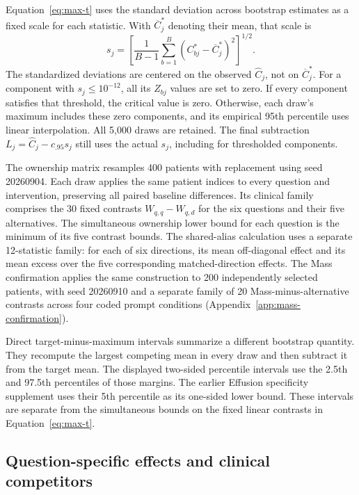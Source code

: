 Equation~\ref{eq:max-t} uses the standard deviation across bootstrap
estimates as a fixed scale for each statistic. With $\overline C^*_j$
denoting their mean, that scale is
\begin{equation}
s_j=\left[\frac{1}{B-1}\sum_{b=1}^{B}
       (C^*_{bj}-\overline C^*_j)^2\right]^{1/2}.
\label{eq:bootstrap-scale}
\end{equation}
The standardized deviations are centered on the observed $\widehat C_j$,
not on $\overline C^*_j$. For a component with $s_j\leq10^{-12}$,
all its $Z_{bj}$ values are set to zero. If every component satisfies
that threshold, the critical value is zero. Otherwise, each draw's
maximum includes these zero components, and its empirical 95th percentile
uses linear interpolation. All 5,000 draws are retained. The final
subtraction $L_j=\widehat C_j-c_{.95}s_j$ still uses the actual $s_j$,
including for thresholded components.

The ownership matrix resamples 400 patients with replacement using seed
20260904. Each draw applies the same patient indices to every question
and intervention, preserving all paired baseline differences. Its clinical
family comprises the 30 fixed contrasts $W_{q,q}-W_{q,d}$ for the six
questions and their five alternatives. The simultaneous ownership lower
bound for each question is the minimum of its five contrast bounds.
The shared-alias calculation uses a separate 12-statistic family:
for each of six directions, its mean off-diagonal effect and its mean
excess over the five corresponding matched-direction effects.
The Mass confirmation applies the same construction to 200 independently
selected patients, with seed 20260910 and a separate family of 20
Mass-minus-alternative contrasts across four coded prompt conditions
(Appendix~\ref{app:mass-confirmation}).

Direct target-minus-maximum intervals summarize a different bootstrap
quantity. They recompute the largest competing mean in every draw and
then subtract it from the target mean. The displayed two-sided percentile
intervals use the 2.5th and 97.5th percentiles of those margins. The
earlier Effusion specificity supplement uses their 5th percentile as its
one-sided lower bound. These intervals are separate from the simultaneous
bounds on the fixed linear contrasts in Equation~\ref{eq:max-t}.

\subsection{Question-specific effects and clinical competitors}

